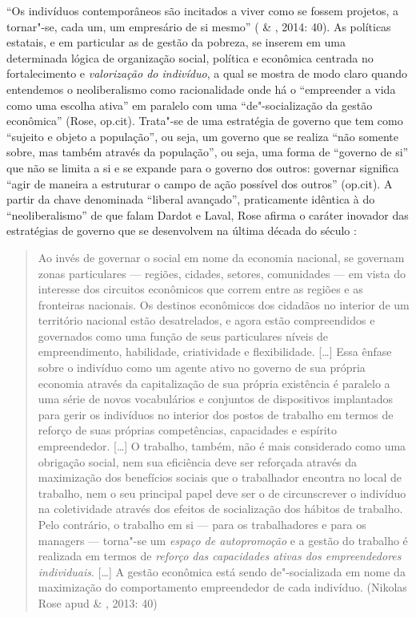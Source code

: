 ``Os indivíduos contemporâneos são incitados a viver como se fossem
projetos, a tornar"-se, cada um, um empresário de si mesmo'' ( \&
, 2014: 40). As políticas estatais, e em particular as de gestão
da pobreza, se inserem em uma determinada lógica de organização social,
política e econômica centrada no fortalecimento e \emph{valorização do
indivíduo}, a qual se mostra de modo claro quando entendemos o
neoliberalismo como racionalidade onde há o ``empreender a vida como uma
escolha ativa'' em paralelo com uma ``de"-socialização da gestão
econômica'' (Rose, op.cit). Trata"-se de uma estratégia de governo que
tem como ``sujeito e objeto a população'', ou seja, um governo que se
realiza ``não somente sobre, mas também através da população'', ou seja,
uma forma de ``governo de si'' que não se limita a si e se expande para
o governo dos outros: governar significa ``agir de maneira a estruturar
o campo de ação possível dos outros'' (op.cit). A partir da chave
denominada ``liberal avançado'', praticamente idêntica à do
``neoliberalismo'' de que falam Dardot e Laval, Rose afirma o caráter
inovador das estratégias de governo que se desenvolvem na última década
do século :

\begin{quote}
Ao invés de governar o social em nome da economia nacional, se governam
zonas particulares --- regiões, cidades, setores, comunidades --- em vista
do interesse dos circuitos econômicos que correm entre as regiões e as
fronteiras nacionais. Os destinos econômicos dos cidadãos no interior de
um território nacional estão desatrelados, e agora estão compreendidos e
governados como uma função de seus particulares níveis de
empreendimento, habilidade, criatividade e flexibilidade. {[}\ldots{}{]} Essa
ênfase sobre o indivíduo como um agente ativo no governo de sua própria
economia através da capitalização de sua própria existência é paralelo a
uma série de novos vocabulários e conjuntos de dispositivos implantados
para gerir os indivíduos no interior dos postos de trabalho em termos de
reforço de suas próprias competências, capacidades e espírito
empreendedor. {[}\ldots{}{]} O trabalho, também, não é mais considerado como
uma obrigação social, nem sua eficiência deve ser reforçada através da
maximização dos benefícios sociais que o trabalhador encontra no local
de trabalho, nem o seu principal papel deve ser o de circunscrever o
indivíduo na coletividade através dos efeitos de socialização dos
hábitos de trabalho. Pelo contrário, o trabalho em si --- para os
trabalhadores e para os managers --- torna"-se um \emph{espaço de
autopromoção} e a gestão do trabalho é realizada em termos de
\emph{reforço das capacidades ativas dos empreendedores individuais}.
{[}\ldots{}{]} A gestão econômica está sendo de"-socializada em nome da
maximização do comportamento empreendedor de cada indivíduo. (Nikolas
Rose apud  \& , 2013: 40)
\end{quote}

